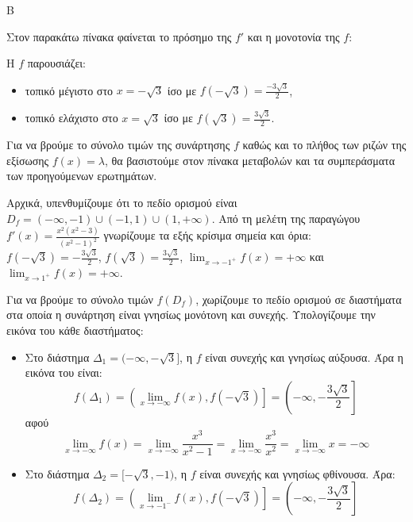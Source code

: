 \begin{thema}{Β}
\begin{erwthma}
Στον παρακάτω πίνακα φαίνεται το πρόσημο της $f'$ και η μονοτονία της $f$:
\begin{center}
\end{center}
Η $f$ παρουσιάζει:
\begin{itemize}
\item τοπικό μέγιστο στο $x = -\sqrt{3}$ ίσο με $f(-\sqrt{3}) = \frac{-3\sqrt{3}}{2}$, 
\item τοπικό ελάχιστο στο $x = \sqrt{3}$ ίσο με $f(\sqrt{3}) = \frac{3\sqrt{3}}{2}$.
\end{itemize}
\item Για να βρούμε το σύνολο τιμών της συνάρτησης $f$ καθώς και το πλήθος των ριζών της εξίσωσης $f(x) = \lambda$, θα βασιστούμε στον πίνακα μεταβολών και τα συμπεράσματα των προηγούμενων ερωτημάτων. 

Αρχικά, υπενθυμίζουμε ότι το πεδίο ορισμού είναι $D_f = (-\infty, -1) \cup (-1, 1) \cup (1, +\infty)$.
Από τη μελέτη της παραγώγου $f'(x) = \frac{x^2(x^2-3)}{(x^2-1)^2}$ γνωρίζουμε τα εξής κρίσιμα σημεία και όρια: $f(-\sqrt{3})= -\frac{3\sqrt{3}}{2}$, $f(\sqrt{3}) = \frac{3\sqrt{3}}{2}$, $\lim_{x \to -1^+} f(x) = +\infty$ και $\lim_{x \to 1^+} f(x) = +\infty$.

Για να βρούμε το σύνολο τιμών $f(D_f)$, χωρίζουμε το πεδίο ορισμού σε διαστήματα στα οποία η συνάρτηση είναι γνησίως μονότονη και συνεχής. Υπολογίζουμε την εικόνα του κάθε διαστήματος:

\begin{itemize}
    \item Στο διάστημα $\Delta_1 = (-\infty, -\sqrt{3}]$, η $f$ είναι συνεχής και γνησίως αύξουσα. Άρα η εικόνα του είναι:
    \[ f(\Delta_1) = \left( \lim_{x \to -\infty} f(x), f(-\sqrt{3}) \right] = \left( -\infty, -\frac{3\sqrt{3}}{2} \right] \]
    αφού \[\lim\limits_{x\to-\infty}{f(x)}=\lim\limits_{x\to-\infty}{\frac{x^3}{x^2-1}}=\lim\limits_{x\to-\infty}{\frac{x^3}{x^2}}=\lim\limits_{x\to-\infty}{x}=-\infty\]
    \item Στο διάστημα $\Delta_2 = [-\sqrt{3}, -1)$, η $f$ είναι συνεχής και γνησίως φθίνουσα. Άρα:
    \[ f(\Delta_2) = \left( \lim_{x \to -1^-} f(x), f(-\sqrt{3}) \right] = \left( -\infty, -\frac{3\sqrt{3}}{2} \right] \]
    

\end{itemize}
\end{erwthma}
\end{thema}
